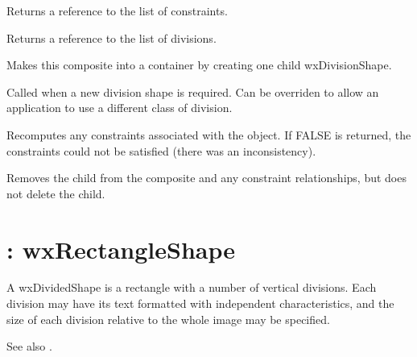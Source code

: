 

Returns a reference to the list of constraints.



Returns a reference to the list of divisions.

\label{wxcompositeshapemakecontainer}


Makes this composite into a container by creating one child wxDivisionShape.



Called when a new division shape is required. Can be overriden to allow an application
to use a different class of division.

\label{wxcompositeshaperecompute}


Recomputes any constraints associated with the object. If FALSE is returned,
the constraints could not be satisfied (there was an inconsistency).



Removes the child from the composite and any constraint relationships, but does not
delete the child.

\section{: wxRectangleShape}\label{wxdividedshape}


A wxDividedShape is a rectangle with a number of vertical divisions. Each
division may have its text formatted with independent characteristics, and
the size of each division relative to the whole image may be specified.

See also .

